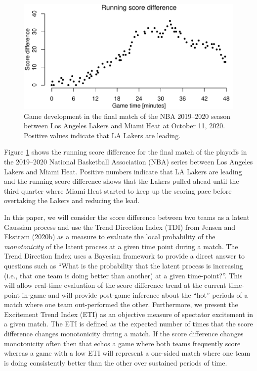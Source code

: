 \documentclass[
  11pt,
]{svjour3}
\theoremstyle{nonumberplain}
\begin{document}
\begin{figure}[htb]
\center
\includegraphics{fig1.pdf}
\caption{Game development in the final match of the NBA 2019--2020 season between Los Angeles Lakers and Miami Heat at October 11, 2020. Positive values indicate that LA Lakers are leading.}
\label{fig1}
\end{figure}

Figure \ref{fig1} shows the running score difference for the final match
of the playoffs in the 2019--2020 National Basketball Association (NBA)
series between Los Angeles Lakers and Miami Heat. Positive numbers
indicate that LA Lakers are leading and the running score difference
shows that the Lakers pulled ahead until the third quarter where Miami
Heat started to keep up the scoring pace before overtaking the Lakers
and reducing the lead.

In this paper, we will consider the score difference between two teams
as a latent Gaussian process and use the Trend Direction Index (TDI)
from Jensen and Ekstrøm (2020b) as a measure to evaluate the local
probability of the \emph{monotonicity} of the latent process at a given
time point during a match. The Trend Direction Index uses a Bayesian
framework to provide a direct answer to questions such as ``What is the
probability that the latent process is increasing (i.e., that one team
is doing better than another) at a given time-point?''. This will allow
real-time evaluation of the score difference trend at the current
time-point in-game and will provide post-game inference about the
``hot'' periods of a match where one team out-performed the other.
Furthermore, we present the Excitement Trend Index (ETI) as an objective
measure of spectator excitement in a given match. The ETI is defined as
the expected number of times that the score difference changes
monotonicity during a match. If the score difference changes
monotonicity often then that echos a game where both teams frequently
score whereas a game with a low ETI will represent a one-sided match
where one team is doing consistently better than the other over
sustained periods of time.
\end{document}
